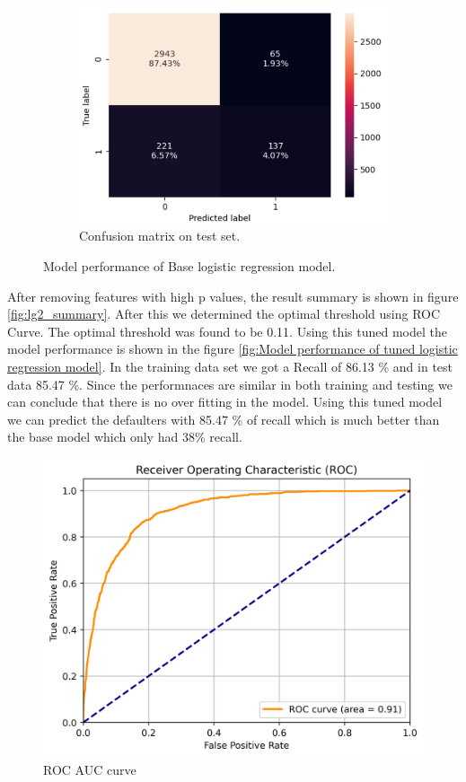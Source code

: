 \documentclass[12pt,a4paper]{article}
\begin{document}
\begin{figure}[h]
\begin{subfigure}[t]{0.45\textwidth}
			\includegraphics[width=\textwidth]{lg_base_c_Matrix_test.png}
			\caption{Confusion matrix on test set.}
			\label{fig: lg_base_c_Matrix_test}
		\end{subfigure}
		\caption{Model performance of Base logistic regression model.}
		\label{fig:Model performance of Base logistic regression model}
	\end{figure}
	
	After removing features with high p values, the result summary is shown in figure \ref{fig:lg2_summary}. After this we determined the optimal threshold using ROC Curve. The optimal threshold was found to be 0.11. Using this tuned model the model performance is shown in the figure \ref{fig:Model performance of tuned logistic regression model}. In the training data set we got a Recall of 86.13 \% and in test data 85.47 \%. Since the performnaces are similar in both training and testing we can conclude that there is no over fitting in the model. Using this tuned model we can predict the defaulters with 85.47 \% of recall which is much better than the base model which only had 38\% recall.  
	\begin{figure}[h]
		\centering
		\includegraphics[width=0.5\linewidth]{roc_auc.png}
		\caption{ROC AUC curve}
		\label{fig:roc_auc}
	\end{figure}
\end{document}
